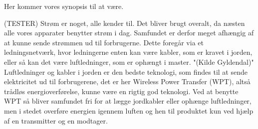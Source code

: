 Her kommer vores synopsis til at være.

(TESTER)
Strøm er noget, alle kender til. Det bliver brugt overalt, da næsten alle vores apparater benytter strøm i dag. Samfundet er derfor meget afhængig af at kunne sende strømmen ud til forbrugerne. Dette foregår via et ledningsnetværk, hvor ledningerne enten kan være kabler, som er kravet i jorden, eller så kan det være luftledninger, som er ophængt i master. "(Kilde Gyldendal)" Luftledninger og kabler i jorden er den bedste teknologi, som findes til at sende elektricitet ud til forbrugerene, det er her Wireless Power Transfer (WPT), altså trådløs energioverførelse, kunne være en rigtig god teknologi. Ved at benytte WPT så bliver samfundet fri for at lægge jordkabler eller ophænge luftledninger, men i stedet overføre energien igennem luften og hen til produktet kun ved hjælp af en transmitter og en modtager.